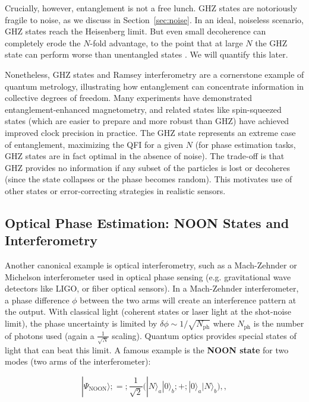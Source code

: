 Crucially, however, entanglement is not a free lunch. GHZ states are
notoriously fragile to noise, as we discuss in
Section~\ref{sec:noise}. In an ideal, noiseless scenario, GHZ states
reach the Heisenberg limit. But even small decoherence can completely
erode the $N$-fold advantage, to the point that at large $N$ the GHZ
state can perform worse than unentangled states \cite{Huelga1997}. We
will quantify this later.



Nonetheless, GHZ states and Ramsey interferometry are a cornerstone
example of quantum metrology, illustrating how entanglement can
concentrate information in collective degrees of freedom. Many
experiments have demonstrated entanglement-enhanced magnetometry, and
related states like spin-squeezed states (which are easier to prepare
and more robust than GHZ) have achieved improved clock precision in
practice. The GHZ state represents an extreme case of entanglement,
maximizing the QFI for a given $N$ (for phase estimation tasks, GHZ
states are in fact optimal in the absence of noise). The trade-off is
that GHZ provides no information if any subset of the particles is
lost or decoheres (since the state collapses or the phase becomes
random). This motivates use of other states or error-correcting
strategies in realistic sensors.



\subsection{Optical Phase Estimation: NOON States and Interferometry}



Another canonical example is optical interferometry, such as a
Mach-Zehnder or Michelson interferometer used in optical phase sensing
(e.g. gravitational wave detectors like LIGO, or fiber optical
sensors). In a Mach-Zehnder interferometer, a phase difference $\phi$
between the two arms will create an interference pattern at the
output. With classical light (coherent states or laser light at the
shot-noise limit), the phase uncertainty is limited by $\delta \phi
\sim 1/\sqrt{N_{\text{ph}}}$ where $N_{\text{ph}}$ is the number of
photons used (again a $\frac{1}{\sqrt{N}}$ scaling). Quantum optics
provides special states of light that can beat this limit. A famous
example is the \textbf{NOON state} for two modes (two arms of the
interferometer):

\begin{equation}

|\Psi_{\text{NOON}}\rangle ;=; \frac{1}{\sqrt{2}}\big(|N\rangle_a |0\rangle_b ;+; |0\rangle_a |N\rangle_b \big) ,,

\label{eq:NOON}

\end{equation}

